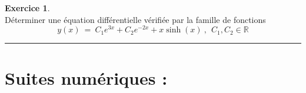 \documentclass[10pt,a4paper]{article}
\newcommand{\R}{\mathbb{R}}
\theoremstyle{definition}
\theoremstyle{definition}
\newtheorem{exo}{Exercice}
\begin{document}
\begin{center}
\begin{minipage}[t]{0.47\linewidth}
\begin{exo}\quad\\
Déterminer une équation différentielle vérifiée par la famille de fonctions
$$y(x) \ = \ C_1e^{3x} + C_2e^{-2x} + x\sinh(x) ~,~~ C_1,C_2\in\R$$
\end{exo}

\begin{center}
\rule{1\linewidth}{0.6pt}
\end{center}

	\end{minipage}
\end{center}

\newpage

\section*{Suites numériques :}
\end{document}
